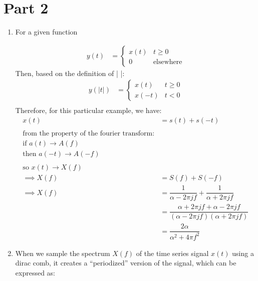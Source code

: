\documentclass[12pt]{article}
\begin{document}
\section*{Part 2}
\begin{enumerate}


\item{ For a given function

\begin{align*}
y(t) &= \left\lbrace\begin{array}{ll}
x(t) & t\geq 0\\
0 & \text{elsewhere}
\end{array}\right.
\end{align*}
Then, based on the definition of | |:
\begin{align*}
y(|t|) &= \left\lbrace\begin{array}{ll}
x(t) & t\geq 0\\
x(-t) & t < 0
\end{array}\right. \\
\end{align*} 
Therefore, for this particular example, we have:
\begin{align*}
x(t) &= s(t) + s(-t) \\ \\
\text{from the property of the fourier transform:} \\
\text{if } a(t) \rightarrow A(f) \\
\text{then } a(-t) \rightarrow A(-f) \\ \\
\text{so } x(t) \rightarrow X(f) \\
\implies X(f) &= S(f) + S(-f)\\
\implies  X(f) &= \dfrac{1}{\alpha - 2\pi j f} + \dfrac{1}{\alpha + 2\pi j f}\\
&=  \dfrac{\alpha + 2\pi j f + \alpha - 2\pi j f}{(\alpha - 2\pi j f)(\alpha + 2\pi j f)}\\
&= \dfrac{2\alpha}{\alpha^2 + 4\pi f^2}
\end{align*}
}
\item{
When we sample the spectrum $X(f)$ of the time series signal $x(t)$ using a dirac comb, it creates a ``periodized'' version of the signal, which can be expressed as:

}
\end{enumerate}
\end{document}
